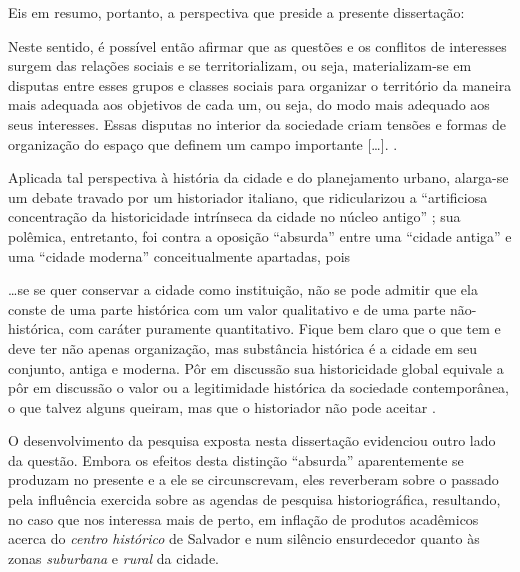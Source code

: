 Eis em resumo, portanto, a perspectiva que preside a presente dissertação:

\begin{citacao}
Neste sentido, é possível então afirmar que as questões e os conflitos de interesses surgem das relações sociais e se territorializam, ou seja, materializam-se em disputas entre esses grupos e classes sociais para organizar o território da maneira mais adequada aos objetivos de cada um, ou seja, do modo mais adequado aos seus interesses. Essas disputas no interior da sociedade criam tensões e formas de organização do espaço que definem um campo importante [\dots]. \cite[p.~41]{CASTRO2005}.
\end{citacao}

Aplicada tal perspectiva à história da cidade e do planejamento urbano, alarga-se um debate travado por um historiador italiano, que ridicularizou a ``artificiosa concentração da historicidade intrínseca da cidade no núcleo antigo'' \cite[p.~74]{argan_histcid_1992}; sua polêmica, entretanto, foi contra a oposição ``absurda'' entre uma ``cidade antiga'' e uma ``cidade moderna'' conceitualmente apartadas, pois 

\begin{citacao}
\dots se se quer conservar a cidade como instituição, não se pode admitir que ela conste de uma parte histórica com um valor qualitativo e de uma parte não-histórica, com caráter puramente quantitativo. Fique bem claro que o que tem e deve ter não apenas organização, mas substância histórica é a cidade em seu conjunto, antiga e moderna. Pôr em discussão sua historicidade global equivale a pôr em discussão o valor ou a legitimidade histórica da sociedade contemporânea, o que talvez alguns queiram, mas que o historiador não pode aceitar \cite[p.~79]{argan_histcid_1992}.
\end{citacao}

O desenvolvimento da pesquisa exposta nesta dissertação evidenciou outro lado da questão. Embora os efeitos desta distinção ``absurda'' aparentemente se produzam no presente e a ele se circunscrevam, eles reverberam sobre o passado pela influência exercida sobre as agendas de pesquisa historiográfica, resultando, no caso que nos interessa mais de perto, em inflação de produtos acadêmicos acerca do \textit{centro histórico} de Salvador e num silêncio ensurdecedor quanto às zonas \textit{suburbana} e \textit{rural} da cidade. 

